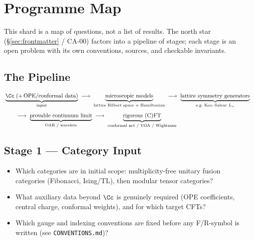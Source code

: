 
\section{Programme Map}

This shard is a map of questions, not a list of results. The north star
(\S\ref{sec:frontmatter} / CA-00) factors into a pipeline of stages; each stage
is an open problem with its own conventions, sources, and checkable invariants.

\subsection{The Pipeline}

\[
\begin{aligned}
  &\underbrace{\Cc \;(+\,\text{OPE/conformal data})}_{\text{input}}
  \;\longrightarrow\;
  \underbrace{\text{microscopic models}}_{\text{lattice Hilbert space + Hamiltonian}}
  \;\longrightarrow\;
  \underbrace{\text{lattice symmetry generators}}_{\text{e.g.\ Koo--Saleur } L_n}\\[4pt]
  &\qquad\longrightarrow\;
  \underbrace{\text{provable continuum limit}}_{\text{OAR / wavelets}}
  \;\longrightarrow\;
  \underbrace{\text{rigorous (C)FT}}_{\text{conformal net / VOA / Wightman}}
\end{aligned}
\]

\subsection{Stage 1 --- Category Input}

\begin{itemize}
  \item Which categories are in initial scope: multiplicity-free unitary fusion
  categories (Fibonacci, Ising/$\mathrm{TL}$), then modular tensor categories?
  \item What auxiliary data beyond $\Cc$ is genuinely required (OPE coefficients,
  central charge, conformal weights), and for which target CFTs?
  \item Which gauge and indexing conventions are fixed before any F/R-symbol is
  written (see \texttt{CONVENTIONS.md})?
\end{itemize}

